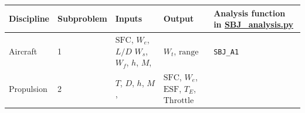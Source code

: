 \documentclass[11pt]{article}
\begin{document}
\begin{longtable}[]{@{}lllll@{}}
\toprule
\begin{minipage}[b]{0.07\columnwidth}\raggedright
Discipline\strut
\end{minipage} & \begin{minipage}[b]{0.03\columnwidth}\raggedright
Subproblem\strut
\end{minipage} & \begin{minipage}[b]{0.42\columnwidth}\raggedright
Inputs\strut
\end{minipage} & \begin{minipage}[b]{0.17\columnwidth}\raggedright
Output\strut
\end{minipage} & \begin{minipage}[b]{0.16\columnwidth}\raggedright
Analysis function in \url{SBJ_analysis.py}\strut
\end{minipage}\tabularnewline
\midrule
\endhead
\begin{minipage}[t]{0.07\columnwidth}\raggedright
Aircraft\strut
\end{minipage} & \begin{minipage}[t]{0.03\columnwidth}\raggedright
1\strut
\end{minipage} & \begin{minipage}[t]{0.42\columnwidth}\raggedright
\(\text{SFC}\), \(W_e\), \(L/D\) \(W_s\), \(W_f\), \(h\), \(M\),\strut
\end{minipage} & \begin{minipage}[t]{0.17\columnwidth}\raggedright
\(W_t\), \(\text{range}\)\strut
\end{minipage} & \begin{minipage}[t]{0.16\columnwidth}\raggedright
\texttt{SBJ\_A1}\strut
\end{minipage}\tabularnewline
\begin{minipage}[t]{0.07\columnwidth}\raggedright
Propulsion\strut
\end{minipage} & \begin{minipage}[t]{0.03\columnwidth}\raggedright
2\strut
\end{minipage} & \begin{minipage}[t]{0.42\columnwidth}\raggedright
\(T\), \(D\), \(h\), \(M\),\strut
\end{minipage} & \begin{minipage}[t]{0.17\columnwidth}\raggedright
\(\text{SFC}\), \(W_e\), \(\text{ESF}\), \(T_{E}\),
\(\text{Throttle}\)\strut
\end{minipage} & \begin{minipage}[t]{0.16\columnwidth}\raggedright

\end{minipage}
\end{longtable}
\end{document}
